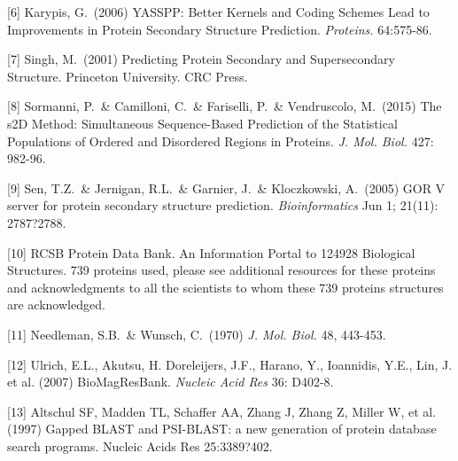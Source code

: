 \documentclass{article}
\begin{document}
[6] Karypis, G.\ (2006) YASSPP: Better Kernels and Coding Schemes Lead to Improvements in Protein Secondary Structure Prediction. {\it Proteins.} 64:575-86.

[7] Singh, M.\ (2001) Predicting Protein Secondary and Supersecondary Structure. Princeton University. CRC Press.

[8] Sormanni, P.\ \& Camilloni, C.\ \& Fariselli, P.\ \& Vendruscolo, M.\ (2015) The s2D Method: Simultaneous Sequence-Based Prediction of the Statistical Populations of Ordered and Disordered Regions in Proteins. {\it J. Mol. Biol.} 427: 982-96.

[9] Sen, T.Z.\ \& Jernigan, R.L.\ \& Garnier, J.\ \& Kloczkowski, A.\ (2005) GOR V server for protein secondary structure prediction. {\it Bioinformatics} Jun 1; 21(11): 2787?2788.

[10] RCSB Protein Data Bank. An Information Portal to 124928 Biological Structures. 739 proteins used, please see additional resources for these proteins and acknowledgments to all the scientists to whom these 739 proteins structures are acknowledged.

[11] Needleman, S.B.\ \& Wunsch, C.\ (1970) {\it J. Mol. Biol.} 48, 443-453.

[12] Ulrich, E.L., Akutsu, H. Doreleijers, J.F., Harano, Y., Ioannidis, Y.E., Lin, J. et al. (2007) BioMagResBank. {\it Nucleic Acid Res} 36: D402-8.

[13] Altschul SF, Madden TL, Schaffer AA, Zhang J, Zhang Z, Miller W, et al. (1997) Gapped BLAST and PSI-BLAST: a new generation of protein database search programs. Nucleic Acids Res 25:3389?402.
\end{document}
